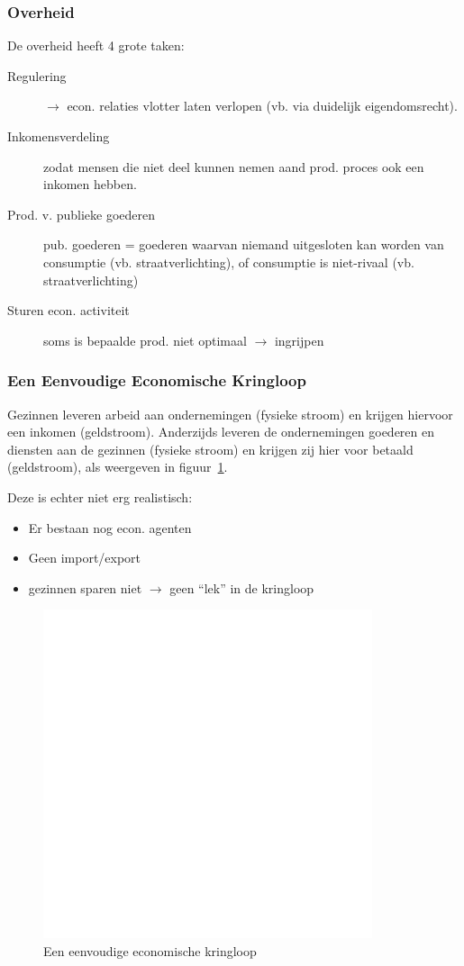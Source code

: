 \subsubsection{Overheid}
De overheid heeft 4 grote taken:
\begin{description}
	\item[Regulering] $\rightarrow$ econ. relaties vlotter laten verlopen (vb. via duidelijk eigendomsrecht).
    \item[Inkomensverdeling] zodat mensen die niet deel kunnen nemen aand prod. proces ook een inkomen hebben.
    \item[Prod. v. publieke goederen] pub. goederen = goederen waarvan niemand uitgesloten kan worden van consumptie (vb. straatverlichting), of consumptie is niet-rivaal (vb. straatverlichting)
    \item[Sturen econ. activiteit] soms is bepaalde prod. niet optimaal $\rightarrow$ ingrijpen
\end{description}

\subsubsection{Een Eenvoudige Economische Kringloop}
Gezinnen leveren arbeid aan ondernemingen (fysieke stroom) en krijgen hiervoor een inkomen (geldstroom). Anderzijds leveren de ondernemingen goederen en diensten aan de gezinnen (fysieke stroom) en krijgen zij hier voor betaald (geldstroom), als weergeven in figuur~\ref{fig:eenvoudigeEconomischeKringloop}.

Deze is echter niet erg realistisch:
\begin{itemize}
	\item Er bestaan nog econ. agenten
    \item Geen import/export
    \item gezinnen sparen niet $\rightarrow$ geen ``lek'' in de kringloop
\end{itemize}

\begin{figure}[htbp]
	\centering
	\includegraphics[scale=0.4]{Images/white.png}
	\caption{Een eenvoudige economische kringloop}
	\label{fig:eenvoudigeEconomischeKringloop}
\end{figure}


